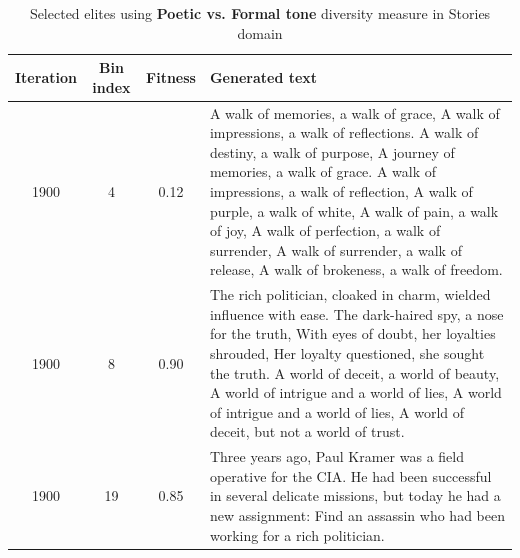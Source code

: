 \begin{table}[H]
  \caption{Selected elites using \textbf{Poetic vs. Formal tone} diversity measure in Stories domain}
  \label{tab:dm-poetic-formal-tone}
  \begin{center}
  \begin{tabular}{cccp{8.5cm}}
    \toprule
    Iteration     & Bin index  & Fitness     & Generated text \\
    \midrule
    1900 &  4 & 0.12 & A walk of memories, a walk of grace, A walk of impressions, a walk of reflections. A walk of destiny, a walk of purpose, A journey of memories, a walk of grace. A walk of impressions, a walk of reflection, A walk of purple, a walk of white, A walk of pain, a walk of joy, A walk of perfection, a walk of surrender, A walk of surrender, a walk of release, A walk of brokeness, a walk of freedom. \\
    \midrule
    1900 & 8 & 0.90 & The rich politician, cloaked in charm, wielded influence with ease. The dark-haired spy, a nose for the truth, With eyes of doubt, her loyalties shrouded, Her loyalty questioned, she sought the truth. A world of deceit, a world of beauty, A world of intrigue and a world of lies, A world of intrigue and a world of lies, A world of deceit, but not a world of trust. \\
    \midrule
    1900 & 19 & 0.85 & Three years ago, Paul Kramer was a field operative for the CIA. He had been successful in several delicate missions, but today he had a new assignment: Find an assassin who had been working for a rich politician. \\
    \bottomrule
  \end{tabular}
  \end{center}
\end{table}